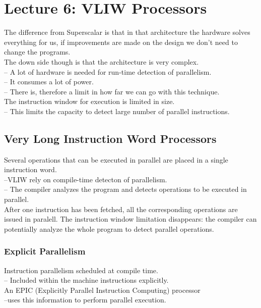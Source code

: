 \section{Lecture 6: VLIW Processors}
The difference from Superscalar is that in that architecture the hardware solves everything for us, if improvements are made on the design we don't need to change the programs. \\
The down side though is that the architecture is very complex. \\
-- A lot of hardware is needed for run-time detection of parallelism. \\
-- It consumes a lot of power. \\
-- There is, therefore a limit in how far we can go with this technique. \\

The instruction window for execution is limited in size. \\
-- This limits the capacity to detect large number of parallel instructions.

\subsection{Very Long Instruction Word Processors}
Several operations that can be executed in parallel are placed in a single instruction word. \\
--VLIW rely on compile-time detecton of parallelism. \\
-- The compiler analyzes the program and detects operations to be executed in parallel. \\

After one instruction has been fetched, all the corresponding operations are issued in paralell.
The instruction window limitation disappears: the compiler can potentially analyze the whole program to detect parallel operations.

\subsubsection{Explicit Parallelism}
Instruction parallelism scheduled at compile time.\\
-- Included within the machine instructions explicitly.\\

An EPIC (Explicitly Parallel Instruction Computing) processor \\
--uses this information to perform parallel execution. \\

